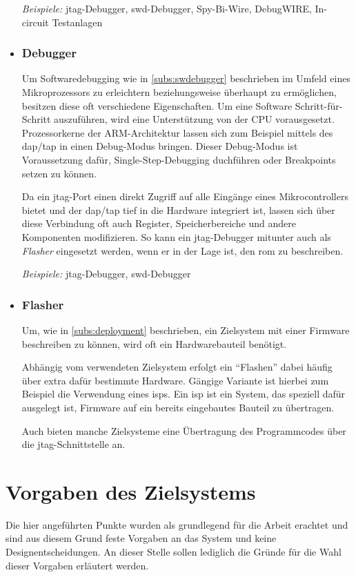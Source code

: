 \begin{itemize}
  \emph{Beispiele:} \gls{jtag}-Debugger, \gls{swd}-Debugger, Spy-Bi-Wire,
  DebugWIRE, In-circuit Testanlagen
  \item \subsubsection*{Debugger}\label{subs:hwdebugger}  Um
  Softwaredebugging wie in \autoref{subs:swdebugger} beschrieben im Umfeld eines
  Mikroprozessors zu erleichtern beziehungsweise überhaupt zu ermöglichen,
  besitzen diese oft verschiedene Eigenschaften.
  Um eine Software Schritt-für-Schritt auszuführen, wird eine Unterstützung von
  der CPU vorausgesetzt. Prozessorkerne der ARM-Architektur lassen sich zum
  Beispiel mittels des \gls{dap}/\gls{tap} in einen Debug-Modus bringen.
  Dieser Debug-Modus ist Voraussetzung dafür, Single-Step-Debugging duchführen
  oder Breakpoints setzen zu können.
  
  Da ein \gls{jtag}-Port einen direkt Zugriff auf alle Eingänge eines
  Mikrocontrollers bietet und der \gls{dap}/\gls{tap} tief in die Hardware
  integriert ist, lassen sich über diese Verbindung oft auch Register,
  Speicherbereiche und andere Komponenten modifizieren. So kann ein
  \gls{jtag}-Debugger mitunter auch als \emph{Flasher} eingesetzt werden, wenn
  er in der Lage ist, den \gls{rom} zu beschreiben.
  
  \emph{Beispiele:} \gls{jtag}-Debugger, \gls{swd}-Debugger
  \item \subsubsection*{Flasher} Um, wie in \autoref{subs:deployment}
  beschrieben, ein Zielsystem mit einer Firmware beschreiben zu können, wird
  oft ein Hardwarebauteil benötigt.
  
  Abhängig vom verwendeten Zielsystem erfolgt ein "`Flashen"' dabei häufig über
  extra dafür bestimmte Hardware. Gängige Variante ist hierbei zum Beispiel die
  Verwendung eines \glspl{isp}. Ein \gls{isp} ist ein System, das speziell
  dafür ausgelegt ist, Firmware auf ein bereits eingebautes Bauteil zu übertragen.
  
  Auch bieten manche Zielsysteme eine Übertragung des Programmcodes über die
  \gls{jtag}-Schnittstelle an.
\end{itemize}
\section{Vorgaben des Zielsystems}
Die hier angeführten Punkte wurden als grundlegend für die Arbeit erachtet und
sind aus diesem Grund feste Vorgaben an das System und keine
Designentscheidungen. An dieser Stelle sollen lediglich die Gründe für
die Wahl dieser Vorgaben erläutert werden.

